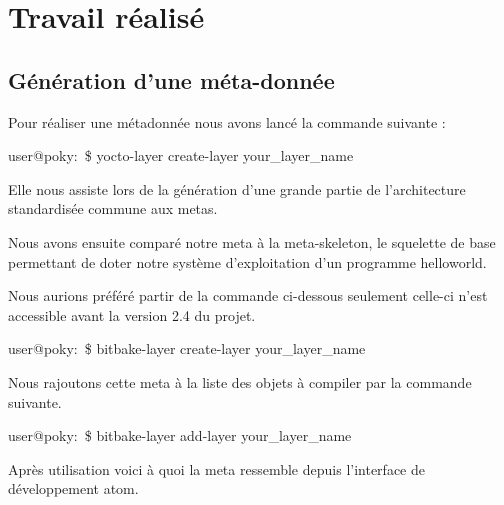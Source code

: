 
\chapter{Travail réalisé} %

\label{Chapter3} %


\section{Génération d'une méta-donnée}

Pour réaliser une métadonnée nous avons lancé la commande suivante :

\begin{tcolorbox}
    user@poky:~\$ yocto-layer create-layer your\_layer\_name
\end{tcolorbox}

Elle nous assiste lors de la génération d’une grande partie de l’architecture standardisée
commune aux metas. \medskip 

Nous avons ensuite comparé notre meta à la meta-skeleton, le squelette de base
permettant de doter notre système d’exploitation d’un programme helloworld. \medskip 

Nous aurions préféré partir de la commande ci-dessous seulement celle-ci n’est
accessible avant la version 2.4 du projet.

\begin{tcolorbox}
    user@poky:~\$ bitbake-layer create-layer your\_layer\_name
\end{tcolorbox}

Nous rajoutons cette meta à la liste des objets à compiler par la commande suivante.

\begin{tcolorbox}
    user@poky:~\$ bitbake-layer add-layer your\_layer\_name
\end{tcolorbox}

Après utilisation voici à quoi la meta ressemble depuis l’interface de développement atom.

